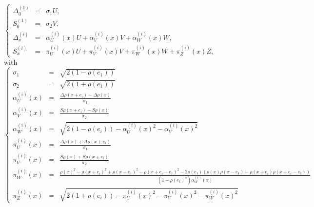 \documentclass[12pt]{article}
\theoremstyle{Theorem}
\begin{document}
$\left\{
  \begin{array}{rlc}
  \Delta^{\scriptscriptstyle (1)}_{\scriptscriptstyle 0} & = & \sigma_1U, \\
  S^{\scriptscriptstyle (1)}_{\scriptscriptstyle 0} & = & \sigma_2V, \\
  \Delta^{\scriptscriptstyle (i)}_{\scriptscriptstyle  x}& = &  \alpha^{\scriptscriptstyle(i)}_{U}(x)U +  \alpha^{\scriptscriptstyle(i)}_{V}(x) V +  \alpha^{\scriptscriptstyle(i)}_{W}(x) W, \\
  S^{\scriptscriptstyle (i)}_{\scriptscriptstyle x} & = &    \pi^{\scriptscriptstyle(i)}_{U}(x)U +  \pi^{\scriptscriptstyle(i)}_{V}(x) V +  \pi^{\scriptscriptstyle(i)}_{W}(x) W +  \pi^{\scriptscriptstyle(i)}_{Z}(x)Z, 
\end{array}\right.$ \\
with 
$\left\{
 \begin{array}{rlc}
 \sigma_1 & = &  \sqrt{2(1-\rho(e_1))} \\
 \sigma_2 & = & \sqrt{2(1+\rho(e_1))} \\
   \alpha^{\scriptscriptstyle(i)}_{U}(x) & = & \frac{\Delta \rho(x+e_i) -\Delta \rho(x)}{\sigma_1} \\
   \alpha^{\scriptscriptstyle(i)}_{V}(x) & = &  \frac{S\rho(x+e_i)-S\rho(x)}{\sigma_{2}}  \\
   \alpha^{\scriptscriptstyle(i)}_{W}(x)& = & \sqrt{2(1 - \rho(e_{i})) - \alpha^{\scriptscriptstyle(i)}_{U}(x)^{2} - \alpha^{\scriptscriptstyle(i)}_{V}(x)^{2}} \\ 
   \pi^{\scriptscriptstyle(i)}_{U}(x) & = &  \frac{\Delta \rho(x) + \Delta \rho(x+e_i)}{\sigma_1} \\
    \pi^{\scriptscriptstyle(i)}_{V}(x) & = & \frac{S \rho(x) + S\rho(x+e_i)}{\sigma_{2}} \\
   \pi^{\scriptscriptstyle(i)}_{W}(x) & = & \frac{\rho(x)^{2} - \rho(x+e_i)^{2} + \rho(x-e_1)^{2} - \rho(x + e_i - e_1)^{2} - 2\rho(e_1)\left(\rho(x)\rho(x-e_1) - \rho(x+e_i)\rho(x+e_i-e_1)\right)}{(1-\rho(e_1)^{2})\alpha^{\scriptscriptstyle(i)}_{W}(x)}\\
   \pi^{\scriptscriptstyle(i)}_{Z}(x)& = & \sqrt{2(1 + \rho(e_i)) - \pi^{\scriptscriptstyle(i)}_{U}(x)^{2} - \pi^{\scriptscriptstyle(i)}_{V}(x)^{2} - \pi^{\scriptscriptstyle(i)}_{W}(x)^{2}}
\end{array}\right.$ 
\end{document}
